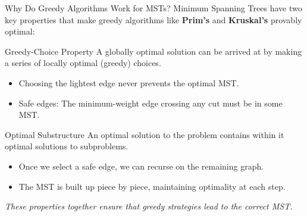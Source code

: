 \documentclass{beamer}
\begin{document}
\begin{frame}{Why Do Greedy Algorithms Work for MSTs?}
Minimum Spanning Trees have two key properties that make greedy algorithms like \textbf{Prim's} and \textbf{Kruskal's} provably optimal:

\vspace{1em}
\begin{block}{Greedy-Choice Property}
A globally optimal solution can be arrived at by making a series of locally optimal (greedy) choices.
\begin{itemize}
    \item Choosing the lightest edge never prevents the optimal MST.
    \item Safe edges: The minimum-weight edge crossing any cut must be in some MST.
\end{itemize}
\end{block}

\begin{block}{Optimal Substructure}
An optimal solution to the problem contains within it optimal solutions to subproblems.
\begin{itemize}
    \item Once we select a safe edge, we can recurse on the remaining graph.
    \item The MST is built up piece by piece, maintaining optimality at each step.
\end{itemize}
\end{block}

\vspace{0.5em}
\textit{These properties together ensure that greedy strategies lead to the correct MST.}
\end{frame}
\end{document}
